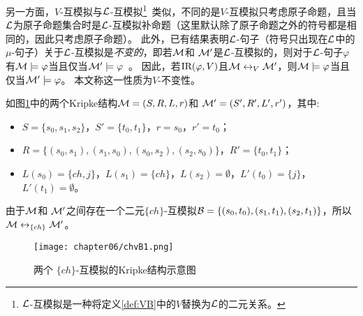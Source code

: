 另一方面，$V$-互模拟与${\cal L}$-互模拟\footnote{${\cal L}$-互模拟是一种将定义\ref{def:VB}中的$V$替换为${\cal L}$的二元关系。}~\cite{d1996uniform}类似，不同的是$V$-互模拟只考虑原子命题，且当${\cal L}$为原子命题集合时是${\cal L}$-互模拟补命题（这里默认除了原子命题之外的符号都是相同的，因此只考虑原子命题）。
此外，已有结果表明${\cal L}$-句子（符号只出现在${\cal L}$中的$\mu$-句子）关于${\cal L}$-互模拟是{\em 不变的}，即若${\cal M}$和 ${\cal M}'$是${\cal L}$-互模拟的，则对于${\cal L}$-句子$\varphi$有${\cal M} \models \varphi$当且仅当${\cal M}' \models \varphi$~\cite{d1996uniform,bradfield2018mu}。
因此，若$\textrm{IR}(\varphi, V)$且${\cal M} \leftrightarrow_V {\cal M}'$，则${\cal M} \models \varphi$当且仅当${\cal M}' \models \varphi$。
本文称这一性质为$V$-不变性。
\begin{example}
	\label{exmp:c06:bisim}
	如图\ref{chapter06:fig:bisim}中的两个Kripke结构${\cal M}=(S,R,L,r)$和 ${\cal M}'=(S',R',L',r')$，其中:
	\begin{itemize}
		\item $S=\{s_0,s_1,s_2\}$，$S'=\{t_0,t_1\}$，$r=s_0$，$r'=t_0$；
		\item $R=\{(s_0,s_1),(s_1,s_0),(s_0,s_2),(s_2,s_0)\}$，$R'=\{t_0,t_1\}$；
		\item $L(s_0)=\{ch,j\}$，$L(s_1)=\{ch\}$，$L(s_2)=\emptyset$，$L'(t_0)=\{j\}$，$L'(t_1)=\emptyset$。
	\end{itemize}
	由于${\cal M}$和 ${\cal M}'$之间存在一个二元$\{ch\}$-互模拟${\cal B}=\{(s_0, t_0), (s_1, t_1), (s_2, t_1)\}$，所以 ${\cal M} \leftrightarrow_{\{ch\}} {\cal M}'$。%
	
	
	
	
	\begin{figure}[h]%
		\centering
		\texttt{[image: chapter06/chvB1.png]}
		\caption{两个 $\{ch\}$-互模拟的Kripke结构示意图}\label{chapter06:fig:bisim}
		
	\end{figure}
	
\end{example}

